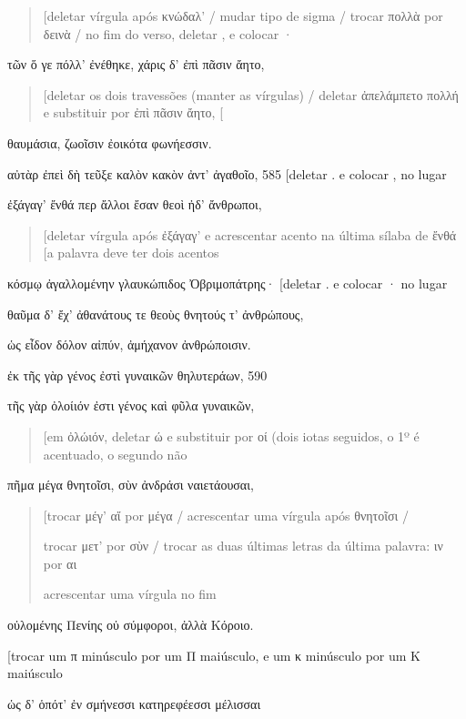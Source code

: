 \begin{quote}
{[}deletar vírgula após κνώδαλ' / mudar tipo de sigma / trocar πολλὰ por
δεινὰ / no fim do verso, deletar , e colocar ·
\end{quote}

τῶν ὅ γε πόλλ' ἐνέθηκε, χάρις δ' ἐπὶ πᾶσιν ἄητο,

\begin{quote}
{[}deletar os dois travessões (manter as vírgulas) / deletar ἀπελάμπετο
πολλή e substituir por ἐπὶ πᾶσιν ἄητο, {[}
\end{quote}

θαυμάσια, ζωοῖσιν ἐοικότα φωνήεσσιν.

αὐτὰρ ἐπεὶ δὴ τεῦξε καλὸν κακὸν ἀντ' ἀγαθοῖο, 585 {[}deletar . e colocar
, no lugar

ἐξάγαγ' ἔνθά περ ἄλλοι ἔσαν θεοὶ ἠδ' ἄνθρωποι,

\begin{quote}
{[}deletar vírgula após ἐξάγαγ' e acrescentar acento na última sílaba de
ἔνθά {[}a palavra deve ter dois acentos
\end{quote}

κόσμῳ ἀγαλλομένην γλαυκώπιδος Ὀβριμοπάτρης· {[}deletar . e colocar · no
lugar

θαῦμα δ' ἔχ' ἀθανάτους τε θεοὺς θνητούς τ' ἀνθρώπους,

ὡς εἶδον δόλον αἰπύν, ἀμήχανον ἀνθρώποισιν.

ἐκ τῆς γὰρ γένος ἐστὶ γυναικῶν θηλυτεράων, 590

τῆς γὰρ ὀλοίιόν ἐστι γένος καὶ φῦλα γυναικῶν,

\begin{quote}
{[}em ὀλώιόν, deletar ώ e substituir por οί (dois iotas seguidos, o 1º é
acentuado, o segundo não
\end{quote}

πῆμα μέγα θνητοῖσι, σὺν ἀνδράσι ναιετάουσαι,

\begin{quote}
{[}trocar μέγ' αἵ por μέγα / acrescentar uma vírgula após θνητοῖσι /

trocar μετ' por σὺν / trocar as duas últimas letras da última palavra:
ιν por αι

acrescentar uma vírgula no fim
\end{quote}

οὐλομένης Πενίης οὐ σύμφοροι, ἀλλὰ Κόροιο.

{[}trocar um π minúsculo por um Π maiúsculo, e um κ minúsculo por um Κ
maiúsculo

ὡς δ' ὁπότ' ἐν σμήνεσσι κατηρεφέεσσι μέλισσαι

